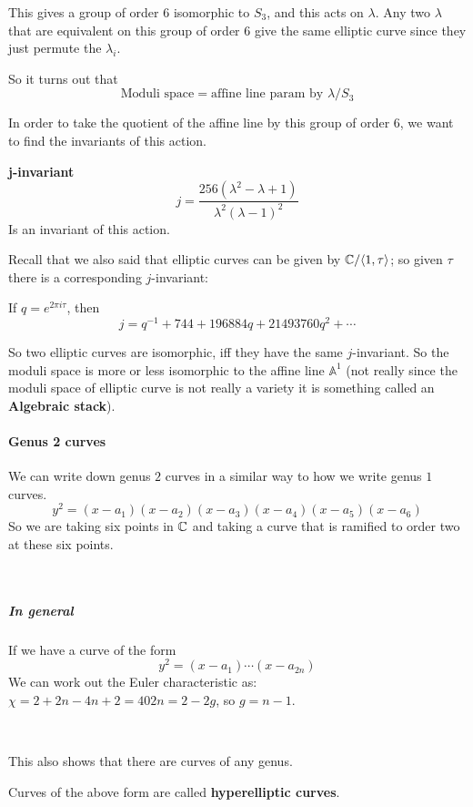 This gives a group of order $6$ isomorphic to $S_3$, and this acts on $\lambda$. Any two $\lambda$ that are equivalent on this group of order $6$ give the same elliptic curve since they just permute the $\lambda_i$.

So it turns out that \[\text{Moduli space} = \text{affine line param by }\lambda/S_3\]

In order to take the quotient of the affine line by this group of order $6$, we want to find the invariants of this action.

\begin{definition}
    \textbf{j-invariant} \[j = \frac{256(\lambda^2-\lambda+1)}{\lambda^2(\lambda-1)^2}\]
    Is an invariant of this action.
\end{definition}


Recall that we also said that elliptic curves can be given by $\mathbb{C}/\langle 1,\tau\rangle$; so given $\tau$ there is a corresponding $j$-invariant:\begin{definition}
    If $q  = e^{2\pi i \tau}$, then \[j = q^{-1} + 744+196884q+21493760q^2+\cdots\]
\end{definition}

So two elliptic curves are isomorphic, iff they have the same $j$-invariant. So the moduli space is more or less isomorphic to the affine line $\mathbb{A}^1$ (not really since the moduli space of elliptic curve is not really a variety it is something called an \textbf{Algebraic stack}).


\paragraph*{Genus 2 curves}
We can write down genus $2$ curves in a similar way to how we write genus $1$ curves.
\[
    y^2 = (x-a_1)(x-a_2)(x-a_3)(x-a_4)(x-a_5)(x-a_6)    
\]
So we are taking six points in $\mathbb{C}$ and taking a curve that is ramified to order two at these six points. 

\

\subparagraph*{In general}
If we have a curve of the form\[y^2 = (x-a_1)\cdots (x-a_{2n})\]
We can work out the Euler characteristic as: $\chi = 2+2n - 4n+2 = 402n = 2-2g$, so $g = n-1$.

\
\begin{remark}
    This also shows that there are curves of any genus.    
\end{remark}

\begin{definition}
    Curves of the above form are called \textbf{hyperelliptic curves}.
\end{definition}

